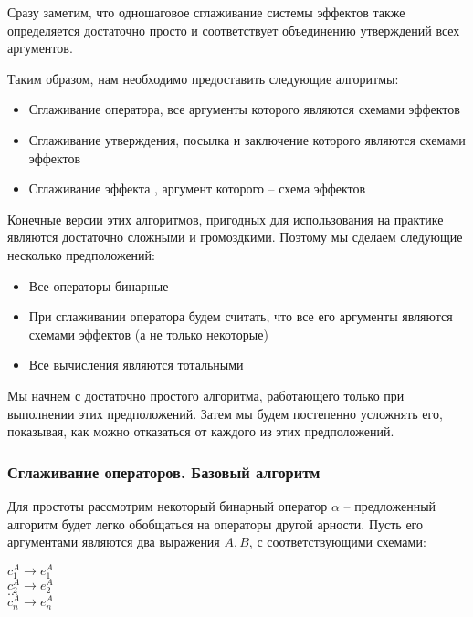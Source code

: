 Сразу заметим, что одношаговое сглаживание системы эффектов также определяется достаточно просто и соответствует объединению утверждений всех аргументов. 

Таким образом, нам необходимо предоставить следующие алгоритмы:

\begin{itemize}
    \item Сглаживание оператора, все аргументы которого являются схемами эффектов
    
    \item Сглаживание утверждения, посылка и заключение которого являются схемами эффектов
    
    \item Сглаживание эффекта , аргумент которого -- схема эффектов
\end{itemize}

Конечные версии этих алгоритмов, пригодных для использования на практике являются достаточно сложными и громоздкими. Поэтому мы сделаем следующие несколько предположений:

\begin{itemize}
    \item Все операторы бинарные
    
    \item При сглаживании оператора будем считать, что все его аргументы являются схемами эффектов (а не только некоторые)
    
    \item Все вычисления являются тотальными
\end{itemize}

Мы начнем с достаточно простого алгоритма, работающего только при выполнении этих предположений. Затем мы будем постепенно усложнять его, показывая, как можно отказаться от каждого из этих предположений.

\subsubsection{Сглаживание операторов. Базовый алгоритм}

Для простоты рассмотрим некоторый бинарный оператор $\alpha$ -- предложенный алгоритм будет легко обобщаться на операторы другой арности. Пусть его аргументами являются два выражения $A, B$, с соответствующими схемами:

{
    $c^A_1 \rightarrow e^A_1$ \\
    $c^A_2 \rightarrow e^A_2$ \\
    $\ldots$ \\
    $c^A_n \rightarrow e^A_n$ \\
}{}

